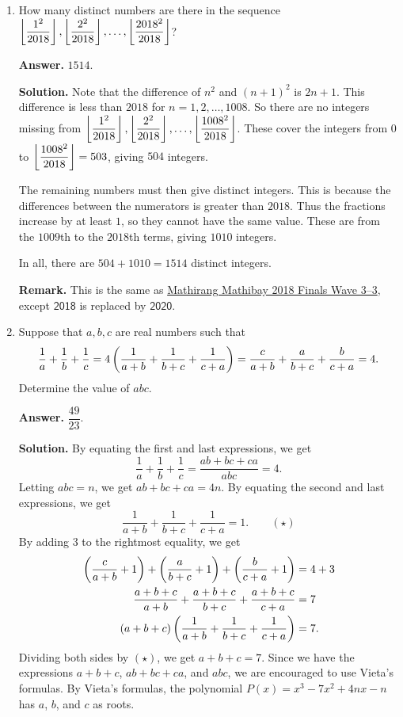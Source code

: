 \documentclass[11pt,paper=letter]{scrartcl}
\begin{document}
\begin{enumerate}[left=0pt]
\item How many distinct numbers are there in the sequence $\left\lfloor \dfrac{1^2}{2018} \right\rfloor, \left\lfloor \dfrac{2^2}{2018} \right\rfloor, \ldots, \left\lfloor \dfrac{2018^2}{2018} \right\rfloor$?

{\sffamily \bfseries Answer.} $\boxed{1514}$.

{\sffamily \bfseries Solution.} Note that the difference of $n^2$ and $(n+1)^2$ is $2n+1$. This difference is less than $2018$ for $n = 1, 2, \ldots, 1008$. So there are no integers missing from $\left\lfloor \dfrac{1^2}{2018} \right\rfloor, \left\lfloor \dfrac{2^2}{2018} \right\rfloor, \ldots, \left\lfloor \dfrac{1008^2}{2018} \right\rfloor$. These cover the integers from $0$ to $\left\lfloor \dfrac{1008^2}{2018} \right\rfloor = 503$, giving $504$ integers.

The remaining numbers must then give distinct integers. This is because the differences between the numerators is greater than $2018$. Thus the fractions increase by at least $1$, so they cannot have the same value. These are from the $1009$th to the $2018$th terms, giving $1010$ integers. 

In all, there are $504 + 1010 = 1514$ distinct integers.

{\small \sffamily \textbf{Remark.} This is the same as \href{http://cjquines.com/files/mathira2018orals.pdf}{Mathirang Mathibay 2018 Finals Wave 3--3}, except $\mathsf{2018}$ is replaced by $\mathsf{2020}$.}

\item Suppose that $a, b, c$ are real numbers such that $$\frac1a + \frac1b + \frac1c = 4\left( \frac1{a+b} + \frac1{b+c} + \frac1{c+a} \right) = \frac c{a+b} + \frac a{b+c} + \frac b{c+a} = 4.$$ Determine the value of $abc$.

{\sffamily \bfseries Answer.} $\boxed{\dfrac{49}{23}}$.

{\sffamily \bfseries Solution.} By equating the first and last expressions, we get $$\frac1a + \frac1b + \frac1c = \frac{ab + bc + ca}{abc} = 4.$$ Letting $abc = n$, we get $ab + bc + ca = 4n$. By equating the second and last expressions, we get $$\frac1{a+b} + \frac1{b+c} + \frac1{c+a} = 1. \qquad (\star)$$By adding $3$ to the rightmost equality, we get \begin{align*}
\left( \frac c{a+b} + 1 \right) + \left( \frac a{b+c} + 1 \right) + \left( \frac b{c+a} + 1 \right) &= 4 + 3 \\
\frac{a+b+c}{a+b} + \frac{a+b+c}{b+c} + \frac{a+b+c}{c+a} &= 7 \\
(a + b + c)\left( \frac1{a+b} + \frac1{b+c} + \frac1{c+a} \right) &= 7.
\end{align*}
Dividing both sides by $(\star)$, we get $a + b + c = 7$. Since we have the expressions $a + b + c$, $ab + bc + ca$, and $abc$, we are encouraged to use Vieta's formulas. By Vieta's formulas, the polynomial $P(x) = x^3 - 7x^2 + 4nx - n$ has $a$, $b$, and $c$ as roots.


\end{enumerate}
\end{document}
